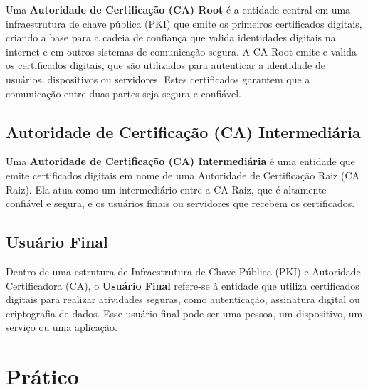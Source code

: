\documentclass{article}
\begin{document}
Uma \textbf{Autoridade de Certificação (CA) Root} é a entidade central em uma infraestrutura de chave pública (PKI) que emite os primeiros certificados digitais, criando a base para a cadeia de confiança que valida identidades digitais na internet e em outros sistemas de comunicação segura. A CA Root emite e valida os certificados digitais, que são utilizados para autenticar a identidade de usuários, dispositivos ou servidores. Estes certificados garantem que a comunicação entre duas partes seja segura e confiável.\\

\subsection{Autoridade de Certificação (CA) Intermediária}

Uma \textbf{Autoridade de Certificação (CA) Intermediária} é uma entidade que emite certificados digitais em nome de uma Autoridade de Certificação Raiz (CA Raiz). Ela atua como um intermediário entre a CA Raiz, que é altamente confiável e segura, e os usuários finais ou servidores que recebem os certificados.\\

\subsection{Usuário Final}

Dentro de uma estrutura de Infraestrutura de Chave Pública (PKI) e Autoridade Certificadora (CA), o \textbf{Usuário Final} refere-se à entidade que utiliza certificados digitais para realizar atividades seguras, como autenticação, assinatura digital ou criptografia de dados. Esse usuário final pode ser uma pessoa, um dispositivo, um serviço ou uma aplicação.\\

\pagebreak

\section{Prático}
\end{document}
